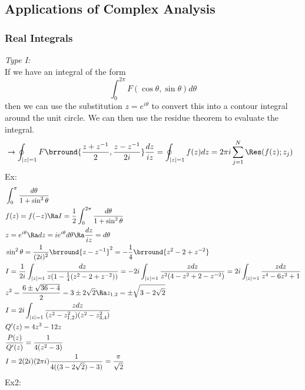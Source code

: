 \subsection{Applications of Complex Analysis}

\subsubsection{Real Integrals}
\textit{Type I:}\\
If we have an integral of the form
\[\int_0^{2\pi} F(\cos\theta,\sin\theta)d\theta\]
then we can use the substitution $z=e^{i\theta}$ to convert this into a contour integral around the unit circle. We can then use the residue theorem to evaluate the integral.
\begin{align*}
    &\to\oint_{|z|=1} F\brround{\frac{z+z^{-1}}{2},\frac{z-z^{-1}}{2i}}\frac{dz}{iz}=\oint_{|z|=1} f(z)dz=2\pi i\sum_{j=1}^N\Res(f(z);z_j)
\end{align*}
Ex:
\begin{align*}
    &\int_0^\pi\frac{d\theta}{1+\sin^2\theta}\\
    &f(z)=f(-z)\Ra I=\frac{1}{2}\int_0^{2\pi}\frac{d\theta}{1+\sin^2\theta}\\
    &z=e^{i\theta}\Ra dz=ie^{i\theta}d\theta\Ra \frac{dz}{iz}=d\theta\\
    &\sin^2\theta=\frac{1}{(2i)^2}\brround{z-z^{-1}}^2=-\frac{1}{4}\brround{z^2-2+z^{-2}}\\
    &I=\frac{1}{2i}\int_{|z|=1}\frac{dz}{z(1-\frac{1}{4}(z^2-2+z^{-2}))}=-2i\int_{|z|=1}\frac{zdz}{z^2(4-z^2+2-z^{-2})}=2i\int_{|z|=1}\frac{zdz}{z^4-6z^2+1}\\
    &z^2=\frac{6\pm\sqrt{36-4}}{2}=3\pm2\sqrt{2}\Ra z_{1,2}=\pm\sqrt{3-2\sqrt{2}}\\
    &I=2i\int_{|z|=1}\frac{zdz}{(z^2-z_{1,2}^2)(z^2-z_{3,4}^2)}\\
    &Q'(z)=4z^3-12z\\
    &\frac{P(z)}{Q'(z)}=\frac{1}{4(z^2-3)}\\
    &I=2(2i)(2\pi i)\frac{1}{4((3-2\sqrt{2})-3)}=\frac{\pi}{\sqrt{2}}
\end{align*}
Ex2:
